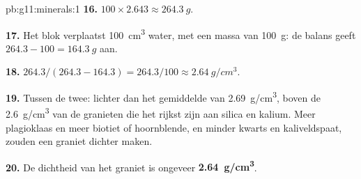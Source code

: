 \begin{solution}{pb:g11:minerals:1}
\textbf{16.} $100 \times 2.643 \approx \qty{264.3}{g}$.

\textbf{17.} Het blok verplaatst \qty{100}{cm^3} water, met een massa van
\qty{100}{g}: de balans geeft $264.3 - 100 = \qty{164.3}{g}$ aan.

\textbf{18.} $264.3/(264.3 - 164.3) = 264.3/100 \approx \qty{2.64}{g/cm^3}$.

\textbf{19.} Tussen de twee: lichter dan het gemiddelde van \qty{2.69}{g/cm^3},
boven de \qty{2.6}{g/cm^3} van de granieten die het rijkst zijn aan silica en kalium.
Meer plagioklaas en meer biotiet of hoornblende, en minder kwarts en
kaliveldspaat, zouden een graniet dichter maken.

\textbf{20.} De dichtheid van het graniet is ongeveer
\textbf{\qty{2.64}{g/cm^3}}.
\end{solution}
